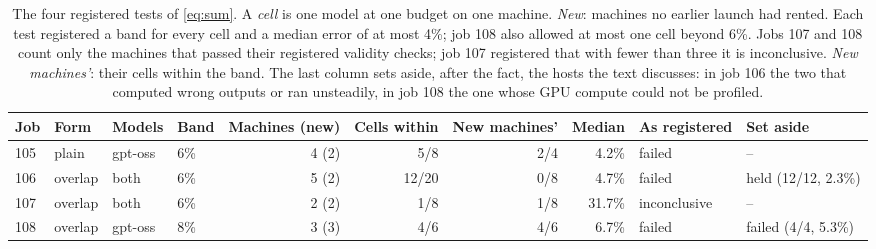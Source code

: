 \begin{table}[t]\centering\footnotesize
\caption{The four registered tests of \cref{eq:sum}. A \emph{cell} is one model at one budget on one machine. \emph{New}: machines no earlier launch had rented. Each test registered a band for every cell and a median error of at most 4\%; job 108 also allowed at most one cell beyond 6\%. Jobs 107 and 108 count only the machines that passed their registered validity checks; job 107 registered that with fewer than three it is inconclusive. \emph{New machines'}: their cells within the band. The last column sets aside, after the fact, the hosts the text discusses: in job 106 the two that computed wrong outputs or ran unsteadily, in job 108 the one whose GPU compute could not be profiled.}\label{tab:regtests}
\setlength\tabcolsep{3.5pt}\begin{tabular}{@{}llllrrrrll@{}}\toprule
Job & Form & Models & Band & Machines (new) & Cells within & New machines' & Median & As registered & Set aside \\\midrule
105 & plain & gpt-oss & 6\% & 4 (2) & 5/8 & 2/4 & 4.2\% & failed & -- \\
106 & overlap & both & 6\% & 5 (2) & 12/20 & 0/8 & 4.7\% & failed & held (12/12, 2.3\%) \\
107 & overlap & both & 6\% & 2 (2) & 1/8 & 1/8 & 31.7\% & inconclusive & -- \\
108 & overlap & gpt-oss & 8\% & 3 (3) & 4/6 & 4/6 & 6.7\% & failed & failed (4/4, 5.3\%) \\
\bottomrule\end{tabular}
\end{table}
